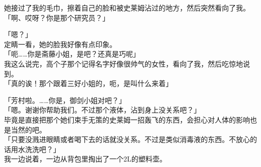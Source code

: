 她接过了我的毛巾，擦着自己的脸和被史莱姆沾过的地方，然后突然看向了我。\\

「啊、哎呀？你是那个研究员？」

「嗯？」\\

定睛一看，她的脸我好像有点印象。\\

「呃……你是斋藤小姐，是吧？还真是巧呢」\\

我这么说完，高个子那个记得名字好像很帅气的女性，看向了我，然后吃惊地说到。\\

「真的诶！那个跟着三好小姐的，呃，是叫什么来着」

「芳村啦。……你是，御剑小姐对吧？」\\

「嗯。谢谢你帮助我们。不过那个液体，沾到身上没关系吧？」\\

毕竟是直接把那个她们束手无策的史莱姆一招轰飞的东西，会担心对人体的影响也是当然的吧。\\

「只要没溅进眼睛或者喝下去的话就没关系。不过是类似消毒液的东西。不放心的话用水洗洗吧？」\\

我一边说着，一边从背包里掏出了一个2L的塑料壶。\\

